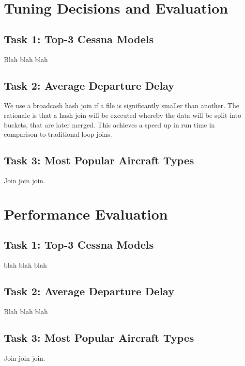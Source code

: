 \documentclass[12pt]{article}
\begin{document}
\newpage{}

{}
\section*{Tuning Decisions and Evaluation}
\subsection*{Task 1: Top-3 Cessna Models}
Blah blah blah
\subsection*{Task 2: Average Departure Delay}
We use a broadcash hash join if a file is significantly smaller than another. The rationale is that a hash join will be executed whereby the data will be split into buckets, that are later merged. This achieves a speed up in run time in comparison to traditional loop joins.
\subsection*{Task 3: Most Popular Aircraft Types}
Join join join.
\newpage{}


{}
\section*{Performance Evaluation}
\subsection*{Task 1: Top-3 Cessna Models}
blah blah blah
\subsection*{Task 2: Average Departure Delay}
Blah blah blah 
\subsection*{Task 3: Most Popular Aircraft Types}
Join join join.
\newpage{}
\end{document}
